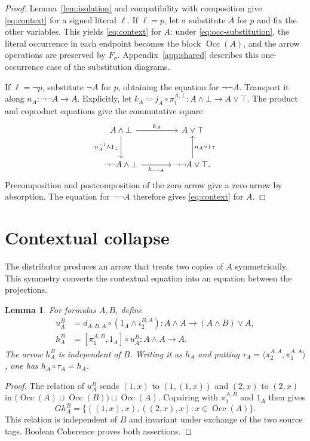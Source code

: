 \documentclass[11pt]{article}
\newtheorem{lemma}[theorem]{Lemma}
\newcommand{\Occ}{\operatorname{Occ}}
\begin{document}
\begin{proof}
Lemma~\ref{lem:isolation} and compatibility with composition give
\eqref{eq:context} for a signed literal $\ell$.
If $\ell=p$, let $\sigma$ substitute $A$ for $p$ and fix the other variables.
This yields \eqref{eq:context} for $A$: under
\eqref{eq:occ-substitution}, the literal occurrence in each endpoint
becomes the block $\Occ(A)$, and the arrow operations are preserved
by $F_\sigma$. Appendix~\ref{app:shared} describes this
one-occurrence case of the substitution diagrams.

If $\ell=\neg p$, substitute $\neg A$ for $p$, obtaining the equation
for $\neg\neg A$. Transport it along $n_A:\neg\neg A\to A$.
Explicitly, let
$k_A=j_A\circ\pi_1^{A,\bot}:A\wedge\bot\to A\vee\top$.
The product and coproduct equations give the commutative square
\[
\begin{tikzcd}[column sep=large,row sep=large]
 A\wedge\bot\arrow[r,"k_A"]\arrow[d,"n_A^{-1}\wedge1_\bot"']
   &A\vee\top\\
 \neg\neg A\wedge\bot\arrow[r,"k_{\neg\neg A}"']
   &\neg\neg A\vee\top\arrow[u,"n_A\vee1_\top"'].
\end{tikzcd}
\]
Precomposition and postcomposition of the zero arrow give a zero
arrow by absorption. The equation for $\neg\neg A$ therefore gives
\eqref{eq:context} for $A$.
\end{proof}

\section{Contextual collapse}\label{sec:collapse}

The distributor produces an arrow that treats two copies of $A$
symmetrically. This symmetry converts the contextual equation into
an equation between the projections.

\begin{lemma}\label{lem:symmetric}
For formulas $A,B$, define
\[
 \begin{aligned}
 u_A^B&=d_{A,B,A}\circ(1_A\wedge\iota_2^{B,A})
       :A\wedge A\longrightarrow(A\wedge B)\vee A,\\
 h_A^B&=[\pi_1^{A,B},1_A]\circ u_A^B:A\wedge A\longrightarrow A.
 \end{aligned}
\]
The arrow $h_A^B$ is independent of $B$. Writing it as $h_A$ and
putting $\tau_A=\langle\pi_2^{A,A},\pi_1^{A,A}\rangle$, one has
$h_A\circ\tau_A=h_A$.
\end{lemma}

\begin{proof}
The relation of $u_A^B$ sends $(1,x)$ to $(1,(1,x))$ and $(2,x)$
to $(2,x)$ in $\bigl(\Occ(A)\sqcup\Occ(B)\bigr)\sqcup\Occ(A)$.
Copairing with $\pi_1^{A,B}$ and $1_A$ then gives
\[
 Gh_A^B=\{((1,x),x),((2,x),x):x\in\Occ(A)\}.
\]
This relation is independent of $B$ and invariant under exchange of
the two source tags. Boolean Coherence proves both assertions.
\end{proof}
\end{document}
